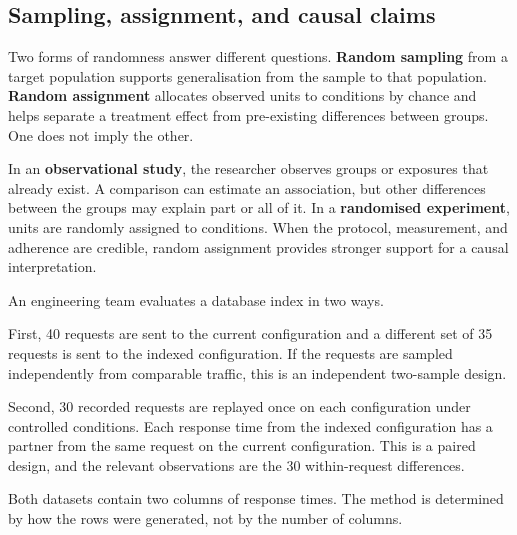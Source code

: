 \FloatBarrier

\subsection{Sampling, assignment, and causal claims}

Two forms of randomness answer different questions. \textbf{Random sampling} from a target population supports generalisation from the sample to that population. \textbf{Random assignment} allocates observed units to conditions by chance and helps separate a treatment effect from pre-existing differences between groups. One does not imply the other.

In an \textbf{observational study}, the researcher observes groups or exposures that already exist. A comparison can estimate an association, but other differences between the groups may explain part or all of it. In a \textbf{randomised experiment}, units are randomly assigned to conditions. When the protocol, measurement, and adherence are credible, random assignment provides stronger support for a causal interpretation.

\begin{example}\par
An engineering team evaluates a database index in two ways.

First, 40 requests are sent to the current configuration and a different set of 35 requests is sent to the indexed configuration. If the requests are sampled independently from comparable traffic, this is an independent two-sample design.

Second, 30 recorded requests are replayed once on each configuration under controlled conditions. Each response time from the indexed configuration has a partner from the same request on the current configuration. This is a paired design, and the relevant observations are the 30 within-request differences.

Both datasets contain two columns of response times. The method is determined by how the rows were generated, not by the number of columns.
\end{example}

